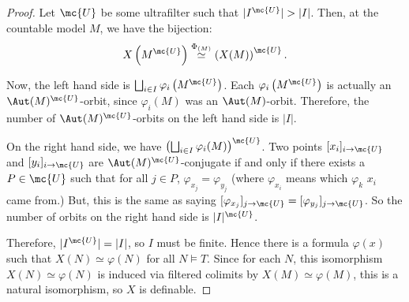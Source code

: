 \begin{proof}
Let $\mc{U}$ be some ultrafilter such that $|I^{\mc{U}}| > |I|$. Then, at the countable model $M$, we have the bijection:
$$
X \left( M^{\mc{U}} \right) \overset{\Phi_{(M)}}{\simeq} \left(X(M)\right)^{\mc{U}}.
$$

Now, the left hand side is $\bigsqcup_{i \in I} \varphi_i\left(M^{\mc{U}}\right)$. Each $\varphi_i \left(M^{\mc{U}}\right)$ is actually an $\Aut(M)^{\mc{U}}$-orbit, since $\varphi_i(M)$ was an $\Aut(M)$-orbit. Therefore, the number of $\Aut(M)^{\mc{U}}$-orbits on the left hand side is $|I|$.

On the right hand side, we have $\left(\bigsqcup_{i \in I} \varphi_i(M)\right)^{\mc{U}}$. Two points $[x_i]_{i \to \mc{U}}$ and $[y_i]_{i \to \mc{U}}$ are $\Aut(M)^{\mc{U}}$-conjugate if and only if there exists a $P \in \mc{U}$ such that for all $j \in P$, $\varphi_{x_j} = \varphi_{y_j}$ (where $\varphi_{x_i}$ means which $\varphi_k$ $x_i$ came from.) But, this is the same as saying $[\varphi_{x_j}]_{j \to \mc{U}} = [\varphi_{y_j}]_{j \to \mc{U}}$. So the number of orbits on the right hand side is $|I|^{\mc{U}}$.

Therefore, $|I^{\mc{U}}| = |I|$, so $I$ must be finite. Hence there is a formula $\varphi(x)$ such that $X(N) \simeq \varphi(N)$ for all $N \models T$. Since for each $N$, this isomorphism $X(N) \simeq \varphi(N)$ is induced via filtered colimits by $X(M) \simeq \varphi(M)$, this is a natural isomorphism, so $X$ is definable.
\end{proof}
  



